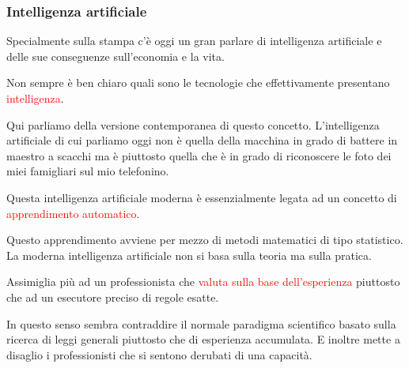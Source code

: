 \documentclass[xcolor=svgnames]{beamer}
\newcommand{\rosso}[1]{\textcolor{red}{#1}}
\renewcommand{\emph}{\rosso}
\begin{document}
\begin{frame}[plain]\small\frametitle{Intelligenza artificiale}

Specialmente sulla stampa c'è oggi un gran parlare di intelligenza artificiale e delle sue conseguenze sull'economia e la vita. 

Non sempre è ben chiaro quali sono le tecnologie che effettivamente presentano \emph{intelligenza}. 

Qui parliamo della versione contemporanea di questo concetto. L'intelligenza artificiale di cui parliamo oggi non è quella della macchina in grado di battere in maestro a scacchi ma è piuttosto quella che è in grado di riconoscere le foto dei miei famigliari sul mio telefonino.


Questa intelligenza artificiale moderna è essenzialmente legata ad un concetto di \emph{apprendimento automatico}.

Questo apprendimento avviene per mezzo di metodi matematici di tipo statistico. La moderna intelligenza artificiale non si basa sulla teoria ma sulla pratica. 

Assimiglia più ad un professionista che \emph{valuta sulla base dell'esperienza} piuttosto che ad un esecutore preciso di regole esatte.

In questo senso sembra contraddire il normale paradigma scientifico basato sulla ricerca di leggi generali piuttosto che di esperienza accumulata. E inoltre mette a disaglio i professionisti che si sentono derubati di una capacità.

















    
\end{frame}
\end{document}
